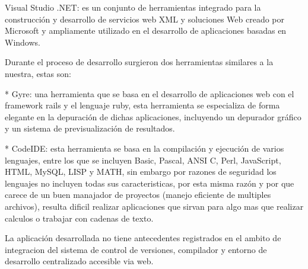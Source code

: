 Visual Studio .NET: es un conjunto de herramientas integrado para la construcción y desarrollo de servicios web XML y soluciones Web creado por Microsoft y ampliamente utilizado en el desarrollo de aplicaciones basadas en Windows.

Durante el proceso de desarrollo surgieron dos herramientas similares a la nuestra, estas son:

* Gyre: una herramienta que se basa en el desarrollo de aplicaciones web con el framework rails y el lenguaje ruby, esta herramienta se especializa de forma elegante en la depuración de dichas aplicaciones, incluyendo un depurador gráfico y un sistema de previsualización de resultados.

* CodeIDE: esta herramienta se basa en la compilación y ejecución de varios lenguajes, entre los que se incluyen Basic, Pascal, ANSI C, Perl, JavaScript, HTML, MySQL, LISP y MATH, sin embargo por razones de seguridad los lenguajes no incluyen todas sus caracteristicas, por esta misma razón y por que carece de un buen manajador de proyectos (manejo eficiente de multiples archivos), resulta dificil realizar aplicaciones que sirvan para algo mas que realizar calculos o trabajar con cadenas de texto.

La aplicación desarrollada no tiene antecedentes registrados en el ambito de integracion del sistema de control de versiones, compilador y entorno de desarrollo centralizado accesible via web.
